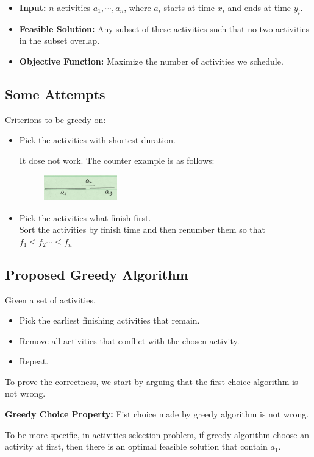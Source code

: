\begin{itemize}
 \item \textbf{Input:} $n$ activities $a_1, \cdots, a_n$, where $a_i$ starts at 
time $x_i$ and ends at time $y_i$.
\item \textbf{Feasible Solution:} Any subset of these activities such that no 
two activities in the subset overlap. 
\item \textbf{Objective Function:} Maximize the number of activities we 
schedule.
\end{itemize}

\subsection{Some Attempts}
Criterions to be greedy on:
\begin{itemize}
	\item Pick the activities with shortest duration. 
	
	It dose not work. The counter example is as follows:
    \begin{figure}[H]
    \centering
    \includegraphics[width=0.3\textwidth]{1st-attempt.png}
    \end{figure}
	\item Pick the activities what finish first.\\
        Sort the activities by finish time and then renumber them so that $f_1 
\le f_2 \cdots \le f_n$
\end{itemize}
\subsection{Proposed Greedy Algorithm}
Given a set of activities, 
\begin{itemize}
	\item Pick the earliest finishing activities that remain.
	\item Remove all activities that conflict with the chosen activity.
	\item Repeat.
\end{itemize}

To prove the correctness, we start by arguing that the first choice algorithm 
is not wrong.

\begin{claim}
	\textbf{Greedy Choice Property:} Fist choice made by greedy algorithm is 
not wrong.
\end{claim}
To be more specific, in activities selection problem, if greedy algorithm 
choose an activity at first, then there is an optimal feasible solution that 
contain $a_1$.

